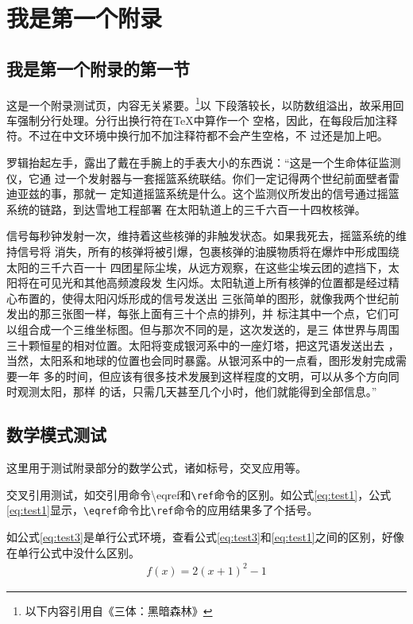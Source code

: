 \chapter{我是第一个附录}
\section{我是第一个附录的第一节}
这是一个附录测试页，内容无关紧要。\footnote{以下内容引用自《三体：黑暗森林》}以%
下段落较长，以防数组溢出，故采用回车强制分行处理。分行出换行符在\TeX 中算作一个%
空格，因此，在每段后加注释符。不过在中文环境中换行加不加注释符都不会产生空格，不%
过还是加上吧。

罗辑抬起左手，露出了戴在手腕上的手表大小的东西说：“这是一个生命体征监测仪，它通%
过一个发射器与一套摇篮系统联结。你们一定记得两个世纪前面壁者雷迪亚兹的事，那就一%
定知道摇篮系统是什么。这个监测仪所发出的信号通过摇篮系统的链路，到达雪地工程部署%
在太阳轨道上的三千六百一十四枚核弹。

信号每秒钟发射一次，维持着这些核弹的非触发状态。如果我死去，摇篮系统的维持信号将%
消失，所有的核弹将被引爆，包裹核弹的油膜物质将在爆炸中形成围绕太阳的三千六百一十%
四团星际尘埃，从远方观察，在这些尘埃云团的遮挡下，太阳将在可见光和其他高频渡段发%
生闪烁。太阳轨道上所有核弹的位置都是经过精心布置的，使得太阳闪烁形成的信号发送出%
三张简单的图形，就像我两个世纪前发出的那三张图一样，每张上面有三十个点的排列，并%
标注其中一个点，它们可以组合成一个三维坐标图。但与那次不同的是，这次发送的，是三%
体世界与周围三十颗恒星的相对位置。太阳将变成银河系中的一座灯塔，把这咒语发送出去%
，当然，太阳系和地球的位置也会同时暴露。从银河系中的一点看，图形发射完成需要一年%
多的时间，但应该有很多技术发展到这样程度的文明，可以从多个方向同时观测太阳，那样%
的话，只需几天甚至几个小时，他们就能得到全部信息。”

\section{数学模式测试}
这里用于测试附录部分的数学公式，诸如标号，交叉应用等。

交叉引用测试，如交引用命令{\ttfamily \textbackslash eqref}和\texttt{\textbackslash ref}命令的区别。如公式\eqref{eq:test1}，公式\ref{eq:test1}显示，\texttt{\textbackslash eqref}命令比\texttt{\textbackslash ref}命令的应用结果多了个括号。

如公式\eqref{eq:test3}是单行公式环境，查看公式\eqref{eq:test3}和\eqref{eq:test1}之间的区别，好像在单行公式中没什么区别。
\begin{align}\label{eq:test3}
	f(x) = 2(x + 1)^{2} - 1
\end{align}

